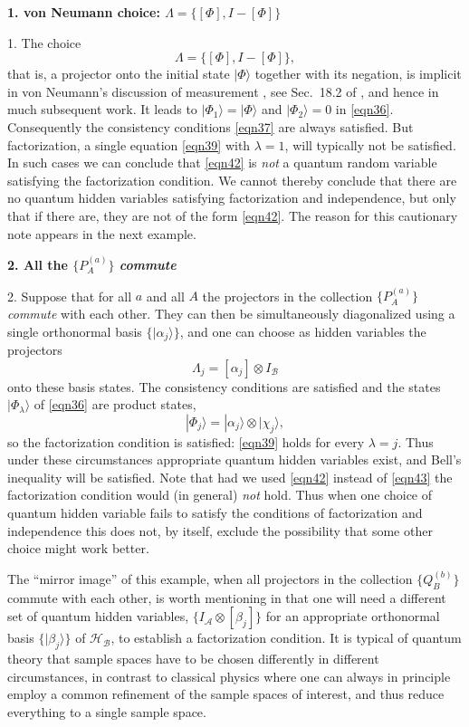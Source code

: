 \documentclass[10pt]{article} %
\def\outl#1{\par{\medskip\noindent\hspace*{.5cm}\bf
      \mathversion{bold}#1\mathversion{normal}\smallskip} }
\def\np{} \def\xa{} \def\xb{} \def\xn{} \def\xp{}
\def\outl#1{} \def\np{} \def\xa{} \def\xb{} \def\xn{} \def\xp{}
\def\outl#1{\par{\medskip\noindent\hspace*{.5cm}\bf
      \mathversion{bold}#1\mathversion{normal}\smallskip} }
\def\np{\newpage }\def\xn{\nopagebreak }\def\xp{\pagebreak }
\newcommand{\ket}[1]{|#1\rgl }
\newcommand{\ot}{\otimes }
\newcommand{\rgl}{\rangle }
\newcommand{\AM}{{\mathcal A}}
\newcommand{\BM}{{\mathcal B}}
\newcommand{\HM}{{\mathcal H}}
\newcommand{\al}{\alpha }
\newcommand{\bt}{\beta }
\newcommand{\lm}{\lambda }
\newcommand{\Lm}{\Lambda }
\begin{document}
\xb
\outl{1. von Neumann choice: $\Lm = \{[\Phi], I-[\Phi] \}$ }
\xa


1. The choice 
\begin{equation}
  \Lm = \{[\Phi], I-[\Phi] \},
\label{eqn42}
\end{equation}
that is, a projector onto the initial state $\ket{\Phi}$ together with its
negation, is implicit in von Neumann's discussion of measurement
\cite{vNmn55}, see Sec.~18.2 of \cite{Grff02c}, and hence in much subsequent
work. It leads to $\ket{\Phi_1}= \ket{\Phi}$ and $\ket{\Phi_2} = 0$ in
\eqref{eqn36}.  Consequently the consistency conditions \eqref{eqn37} are
always satisfied. But factorization, a single equation \eqref{eqn39} with
$\lm=1$, will typically not be satisfied.  In such cases we can conclude that
\eqref{eqn42} is \emph{not} a quantum random variable satisfying the
factorization condition.  We cannot thereby conclude that there are no quantum
hidden variables satisfying factorization and independence, but only that if
there are, they are not of the form \eqref{eqn42}.  The reason for this
cautionary note appears in the next example.

\xb
\outl{2. All the $\{P^{(a)}_A\}$ \emph{commute}}
\xa


2. Suppose that for all $a$ and all $A$ the projectors in the collection
$\{P^{(a)}_A\}$ \emph{commute} with each other.  They can then be
simultaneously diagonalized using a single orthonormal basis
$\{\ket{\al_j}\}$, and one can choose as hidden variables the projectors
\begin{equation}
  \Lm_j = [\al_j] \ot I_\BM
\label{eqn43}
\end{equation}
onto these basis states.  The consistency conditions are satisfied and the
states $\ket{\Phi_\lm}$ of \eqref{eqn36} are product states,
\begin{equation}
  \ket{\Phi_j} = \ket{\al_j}\ot\ket{\chi_j},
\label{eqn44}
\end{equation}
so the factorization condition is satisfied: \eqref{eqn39} holds
for every $\lm=j$.  Thus under these circumstances appropriate
quantum hidden variables exist, and Bell's inequality will be satisfied.  Note
that had we used \eqref{eqn42} instead of \eqref{eqn43} the factorization
condition would (in general) \emph{not} hold.  Thus when one choice
of quantum hidden variable fails to satisfy the conditions of factorization
and independence this does not, by itself, exclude the possibility that some
other choice might work better.

The ``mirror image'' of this example, when all projectors in the collection
$\{Q^{(b)}_B\}$ commute with each other, is worth mentioning in that one will
need a different set of quantum hidden variables, $\{I_\AM\ot[\bt_j]\}$
for an appropriate orthonormal basis $\{\ket{\bt_j}\}$ of $\HM_\BM$, to
establish a factorization condition. It is typical of quantum theory that
sample spaces have to be chosen differently in different circumstances, in
contrast to classical physics where one can always in principle employ a
common refinement of the sample spaces of interest, and thus reduce everything
to a single sample space. 
\end{document}
